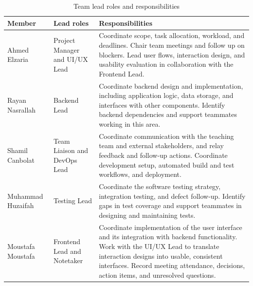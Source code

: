 \documentclass{article}
\begin{document}
\begin{table}[htbp]
    \centering
    \caption{Team lead roles and responsibilities}
    \label{tab:team-member-roles}
    \small
    \renewcommand{\arraystretch}{1.15}
    \begin{tabularx}{\textwidth}{
        @{}>{\raggedright\arraybackslash}p{}
        >{\raggedright\arraybackslash}p{}
        >{\raggedright\arraybackslash}X@{}
    }
        \toprule
        \textbf{Member} &
        \textbf{Lead roles} &
        \textbf{Responsibilities} \\
        \midrule

        Ahmed Elzaria &
        Project Manager and UI/UX Lead &
        Coordinate scope, task allocation, workload, and deadlines.
        Chair team meetings and follow up on blockers. Lead user flows,
        interaction design, and usability evaluation in collaboration
        with the Frontend Lead. \\
        \addlinespace

        Rayan Nasrallah &
        Backend Lead &
        Coordinate backend design and implementation, including
        application logic, data storage, and interfaces with other
        components. Identify backend dependencies and support
        teammates working in this area. \\
        \addlinespace

        Shamil Canbolat &
        Team Liaison and DevOps Lead &
        Coordinate communication with the teaching team and external
        stakeholders, and relay feedback and follow-up actions.
        Coordinate development setup, automated build and test
        workflows, and deployment. \\
        \addlinespace

        Muhammad Huzaifah &
        Testing Lead &
        Coordinate the software testing strategy, integration testing,
        and defect follow-up. Identify gaps in test coverage and
        support teammates in designing and maintaining tests. \\
        \addlinespace

        Moustafa Moustafa &
        Frontend Lead and Notetaker &
        Coordinate implementation of the user interface and its
        integration with backend functionality. Work with the UI/UX
        Lead to translate interaction designs into usable, consistent
        interfaces. Record meeting attendance, decisions, action
        items, and unresolved questions. \\

        \bottomrule
    \end{tabularx}
\end{table}
\end{document}

